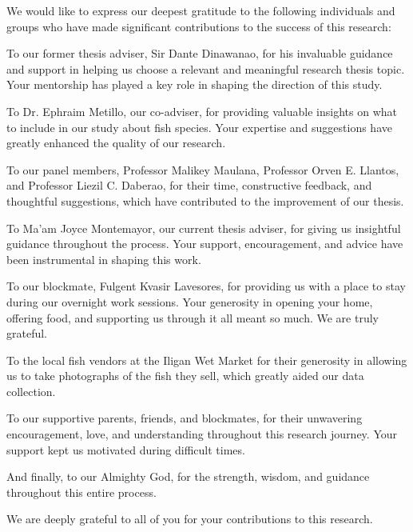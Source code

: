 \begin{acknowledgements}
We would like to express our deepest gratitude to the following individuals and groups who have made significant contributions to the success of this research:

To our former thesis adviser, Sir Dante Dinawanao, for his invaluable guidance and support in helping us choose a relevant and meaningful research thesis topic. Your mentorship has played a key role in shaping the direction of this study.

To Dr. Ephraim Metillo, our co-adviser, for providing valuable insights on what to include in our study about fish species. Your expertise and suggestions have greatly enhanced the quality of our research.

To our panel members, Professor Malikey Maulana, Professor Orven E. Llantos, and Professor Liezil C. Daberao, for their time, constructive feedback, and thoughtful suggestions, which have contributed to the improvement of our thesis.

To Ma'am Joyce Montemayor, our current thesis adviser, for giving us insightful guidance throughout the process. Your support, encouragement, and advice have been instrumental in shaping this work.

To our blockmate, Fulgent Kvasir Lavesores, for providing us with a place to stay during our overnight work sessions. Your generosity in opening your home, offering food, and supporting us through it all meant so much. We are truly grateful.

To the local fish vendors at the Iligan Wet Market for their generosity in allowing us to take photographs of the fish they sell, which greatly aided our data collection.

To our supportive parents, friends, and blockmates, for their unwavering encouragement, love, and understanding throughout this research journey. Your support kept us motivated during difficult times.

And finally, to our Almighty God, for the strength, wisdom, and guidance throughout this entire process.

We are deeply grateful to all of you for your contributions to this research.
\end{acknowledgements}
